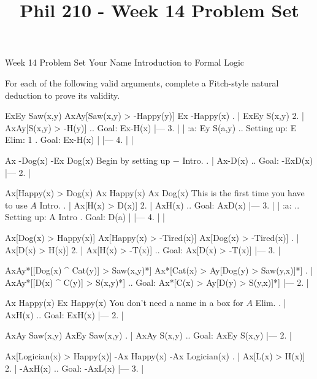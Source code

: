 
\title{Phil 210 - Week 14 Problem Set}

\heading
Week 14 Problem Set
Your Name
Introduction to Formal Logic
\endheading

For each of the following valid arguments, complete a Fitch-style natural deduction to prove its validity.

\quantifiers
\problems
{}
\argument
 ExEy Saw(x,y)
 AxAy[Saw(x,y) > -Happy(y)]
\argumentline
 Ex -Happy(x)
\endargument
	\answer
	. | ExEy S(x,y)
	 2. | AxAy[S(x,y) > -H(y)]  ..  Goal: Ex-H(x)
	    |---
	 3. |   | :a: Ey S(a,y)     ..  Setting up: E Elim: 1  .  Goal: Ex-H(x)
	    |   |---
	 4. |   |
	\endfitchproof
	\endanswer

\argument
 Ax -Dog(x)
\argumentline
 -Ex Dog(x)
\endargument
\Hint Begin by setting up $-$ Intro.
	\answer
	. | Ax-D(x)  ..  Goal: -ExD(x)
	    |---
	 2. | 
	\endfitchproof
	\endanswer

\argument
 Ax[Happy(x) > Dog(x)
 Ax Happy(x)
\argumentline
 Ax Dog(x)
\endargument
\Hint This is the first time you have to use $A$ Intro.
	\answer
	. | Ax[H(x) > D(x)]
	 2. | AxH(x)          ..  Goal: AxD(x)
	    |---
	 3. |   | :a:          ..  Setting up: A Intro  .  Goal: D(a)
	    |   |---
	 4. |   |
	\endfitchproof
	\endanswer

\argument
 Ax[Dog(x) > Happy(x)]
 Ax[Happy(x) > -Tired(x)]
\argumentline
 Ax[Dog(x) > -Tired(x)]
\endargument
	\answer
	. | Ax[D(x) > H(x)]
	 2. | Ax[H(x) > -T(x)]  ..  Goal: Ax[D(x) > -T(x)]
	    |---
	 3. | 
	\endfitchproof
	\endanswer

\argument
 AxAy*[[Dog(x) ^ Cat(y)] > Saw(x,y)*]
\argumentline
 Ax*[Cat(x) > Ay[Dog(y) > Saw(y,x)]*]
\endargument
	\answer
	. | AxAy*[[D(x) ^ C(y)] > S(x,y)*]  ..  Goal: Ax*[C(x) > Ay[D(y) > S(y,x)]*]
	    |---
	 2. | 
	\endfitchproof
	\endanswer

\argument
 Ax Happy(x)
\argumentline
 Ex Happy(x)
\endargument
\Hint You don't need a name in a box for $A$ Elim.
	\answer
	. | AxH(x)  ..  Goal: ExH(x)
	    |---
	 2. | 
	\endfitchproof
	\endanswer

\argument
 AxAy Saw(x,y)
\argumentline
 AxEy Saw(x,y)
\endargument
	\answer
	. | AxAy S(x,y)  ..  Goal: AxEy S(x,y)
	    |---
	 2. |
	\endfitchproof
	\endanswer

\argument
 Ax[Logician(x) > Happy(x)]
 -Ax Happy(x)
\argumentline
 -Ax Logician(x)
\endargument
	\answer
	. | Ax[L(x) > H(x)]
	 2. | -AxH(x)         ..  Goal: -AxL(x)
	    |---
	 3. |
	\endfitchproof
	\endanswer

\endproblems
\bye
